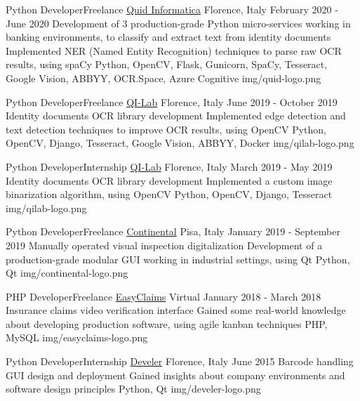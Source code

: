 \begin{cventries}
  \logocventry
    {Python Developer{\enskip\cdotp\enskip}Freelance}
    {\href{https://www.quidinfo.it/}{Quid Informatica}}
    {Florence, Italy}
    {February 2020 - June 2020}
    {
      \cvexp
        {Development of 3 production-grade Python micro-services working in banking environments, to classify and extract text from identity documents}
        {Implemented NER (Named Entity Recognition) techniques to parse raw OCR results, using spaCy}
        {Python, OpenCV, Flask, Gunicorn, SpaCy, Tesseract, Google Vision, ABBYY, OCR.Space, Azure Cognitive}
    }
    {img/quid-logo.png}

  \logocventry
    {Python Developer{\enskip\cdotp\enskip}Freelance}
    {\href{https://www.qi-lab.it/}{QI-Lab}}
    {Florence, Italy}
    {June 2019 - October 2019}
    {
      \cvexp
        {Identity documents OCR library development}
        {Implemented edge detection and text detection techniques to improve OCR results, using OpenCV}
        {Python, OpenCV, Django, Tesseract, Google Vision, ABBYY, Docker}
    }
    {img/qilab-logo.png}
  
  \logocventry
    {Python Developer{\enskip\cdotp\enskip}Internship}
    {\href{https://www.qi-lab.it/}{QI-Lab}}
    {Florence, Italy}
    {March 2019 - May 2019}
    {
      \cvexp
        {Identity documents OCR library development}
        {Implemented a custom image binarization algorithm, using OpenCV}
        {Python, OpenCV, Django, Tesseract}
    }
    {img/qilab-logo.png}

  \logocventry
    {Python Developer{\enskip\cdotp\enskip}Freelance}
    {\href{https://www.continental-pneumatici.it/auto}{Continental}}
    {Pisa, Italy}
    {January 2019 - September 2019}
    {
      \cvexp
        {Manually operated visual inspection digitalization}
        {Development of a production-grade modular GUI working in industrial settings, using Qt}
        {Python, Qt}
    }
    {img/continental-logo.png}

  \logocventry
    {PHP Developer{\enskip\cdotp\enskip}Freelance}
    {\href{https://www.easyclaims.eu}{EasyClaims}}
    {Virtual}
    {January 2018 - March 2018}
    {
      \cvexp
        {Insurance claims video verification interface}
        {Gained some real-world knowledge about developing production software, using agile kanban techniques}
        {PHP, MySQL}
    }
    {img/easyclaims-logo.png}

  \logocventry
    {Python Developer{\enskip\cdotp\enskip}Internship}
    {\href{https://www.develer.com/}{Develer}}
    {Florence, Italy}
    {June 2015}
    {
      \cvexp
        {Barcode handling GUI design and deployment}
        {Gained insights about company environments and software design principles}
        {Python, Qt}
    }
    {img/develer-logo.png}

\end{cventries}
